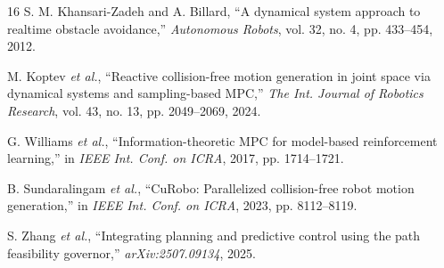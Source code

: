\begin{thebibliography}{16}
S. M. Khansari-Zadeh and A. Billard, ``A dynamical system approach to realtime obstacle avoidance,'' \emph{Autonomous Robots}, vol. 32, no. 4, pp. 433--454, 2012.

M. Koptev \emph{et al.}, ``Reactive collision-free motion generation in joint space via dynamical systems and sampling-based MPC,'' \emph{The Int. Journal of Robotics Research}, vol. 43, no. 13, pp. 2049--2069, 2024.

G. Williams \emph{et al.}, ``Information-theoretic MPC for model-based reinforcement learning,'' in \emph{IEEE Int. Conf. on ICRA}, 2017, pp. 1714--1721.

B. Sundaralingam \emph{et al.}, ``CuRobo: Parallelized collision-free robot motion generation,'' in \emph{IEEE Int. Conf. on ICRA}, 2023, pp. 8112--8119.

S. Zhang \emph{et al.}, ``Integrating planning and predictive control using the path feasibility governor,'' \emph{arXiv:2507.09134}, 2025.

\end{thebibliography}
